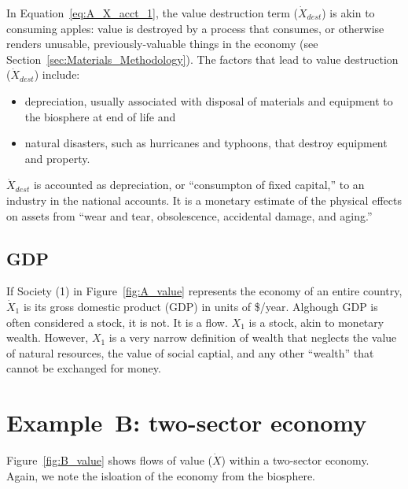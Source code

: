 In Equation~\ref{eq:A_X_acct_1}, 
the value destruction term ($\dot{X}_{dest}$)
is akin to consuming apples: 
value is destroyed by a process that consumes, 
or otherwise renders unusable, 
previously-valuable things in the economy
(see Section~\ref{sec:Materials_Methodology}).
The factors that lead to value destruction
($\dot{X}_{dest}$) include:
%
\begin{itemize}

	\item{depreciation, usually associated with disposal of 
	materials and equipment to the biosphere at end of life and}

	\item{natural disasters, such as hurricanes and typhoons,
	that destroy equipment and property.}

\end{itemize}
%
$\dot{X}_{dest}$ is accounted as depreciation, 
or ``consumpton of fixed capital,'' %
to an industry in the national accounts. 
It is a monetary estimate of the physical effects on assets from 
``wear and tear, obsolescence, accidental damage,
and aging.''~\cite{katz2008} 


\subsection{GDP}

If Society (1) in Figure~\ref{fig:A_value} represents 
the economy of an entire country, 
$\dot{X}_{1}$ is its gross domestic product (GDP)
in units of \$/year. 
Alghough GDP is often considered a stock, it is not. 
It is a flow. 
$X_{1}$ is a stock, akin to monetary wealth. 
However, $X_{1}$ is a very
narrow definition of wealth
that neglects the value of natural resources, 
the value of social captial, and any
other ``wealth'' that cannot be exchanged for money. 


\section{Example~B: two-sector economy} %

Figure~\ref{fig:B_value} shows flows of value ($\dot{X}$) 
within a two-sector economy. 
Again, we note the isloation of the economy from the biosphere.

